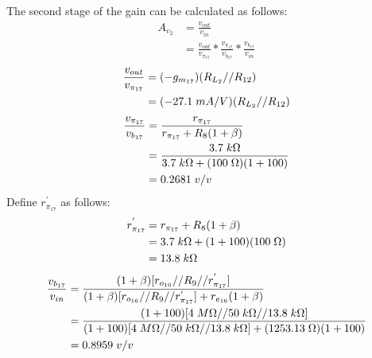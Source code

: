 \documentclass{article}
\begin{document}
	\noindent The second stage of the gain can be calculated as follows:
	\begin{align*}
		A_{v_2} &= \frac{v_{out}}{v_{in}}\\
		&= \frac{v_{out}}{v_{\pi_{17}}} * \frac{v_{\pi_{17}}}{v_{b_{17}}} * \frac{v_{b_{17}}}{v_{in}}
	\end{align*}
	\begin{align*}
		\frac{v_{out}}{v_{\pi_{17}}} &= (-g_{m_{17}}) (R_{L_2} // R_{12})\\
		&= (-27.1 \hspace{1mm} mA/V)(R_{L_2} // R_{12})	
	\end{align*}
	\begin{align*}
		\frac{v_{\pi_{17}}}{v_{b_{17}}} &= \frac{r_{\pi_{17}}}{r_{\pi_{17}} + R_8(1+ \beta)}\\
		&= \frac{3.7 \hspace{1mm} k\Omega}{3.7 \hspace{1mm} k\Omega + (100 \hspace{1mm} \Omega)(1 + 100)}\\
		&= 0.2681 \hspace{1mm} v/v
	\end{align*}
	Define $r_{\pi_{17}}^{'}$ as follows:
	\begin{align*}
		r_{\pi_{17}}^{'} &= r_{\pi_{17}} + R_8(1 + \beta)\\
		&= 3.7 \hspace{1mm} k\Omega + (1 + 100) (100 \hspace{1mm} \Omega)\\
		&= 13.8 \hspace{1mm} k\Omega
	\end{align*}
	\begin{align*}
		\frac{v_{b_{17}}}{v_{in}} &= \frac{(1 + \beta)[r_{o_{16}} // R_9 // r_{\pi_{17}}^{'}]}{(1 + \beta)[r_{o_{16}} // R_9 // r_{\pi_{17}}^{'}] + r_{e_{16}} (1 + \beta)}\\
		&= \frac{(1 + 100) [4 \hspace{1mm} M\Omega // 50 \hspace{1mm} k\Omega // 13.8 \hspace{1mm} k\Omega]}{(1 + 100) [4 \hspace{1mm} M\Omega // 50 \hspace{1mm} k\Omega // 13.8 \hspace{1mm} k\Omega] + (1253.13 \hspace{1mm} \Omega)(1 + 100)}\\
		&= 0.8959 \hspace{1mm} v/v
	\end{align*}
\end{document}
